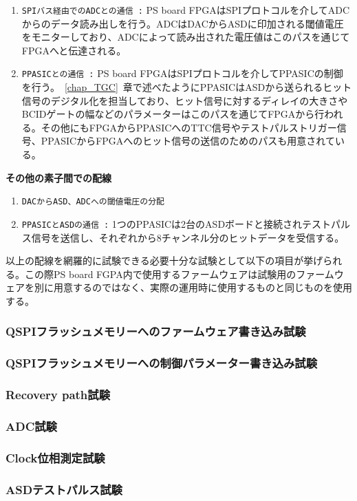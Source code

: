 \begin{enumerate}
    \item \texttt{SPIバス経由でのADCとの通信 :} PS board FPGAはSPIプロトコルを介してADCからのデータ読み出しを行う。ADCはDACからASDに印加される閾値電圧をモニターしており、ADCによって読み出された電圧値はこのパスを通じてFPGAへと伝達される。
    \baselineskip

    \item\texttt{PPASICとの通信 :} PS board FPGAはSPIプロトコルを介してPPASICの制御を行う。~\ref{chap_TGC}~章で述べたようにPPASICはASDから送られるヒット信号のデジタル化を担当しており、ヒット信号に対するディレイの大きさやBCIDゲートの幅などのパラメーターはこのパスを通じてFPGAから行われる。その他にもFPGAからPPASICへのTTC信号やテストパルストリガー信号、PPASICからFPGAへのヒット信号の送信のためのパスも用意されている。
    \baselineskip
\end{enumerate}

\textbf{その他の素子間での配線}
\begin{enumerate}[resume]
    \item \texttt{DACからASD、ADCへの閾値電圧の分配} 
    \baselineskip

    \item \texttt{PPASICとASDの通信 :} 1つのPPASICは2台のASDボードと接続されテストパルス信号を送信し、それぞれから8チャンネル分のヒットデータを受信する。
    \baselineskip
\end{enumerate}


以上の配線を網羅的に試験できる必要十分な試験として以下の項目が挙げられる。この際PS board FGPA内で使用するファームウェアは試験用のファームウェアを別に用意するのではなく、実際の運用時に使用するものと同じものを使用する。

\subsubsection{QSPIフラッシュメモリーへのファームウェア書き込み試験}
\label{subsubsec_QSPI}

\subsubsection{QSPIフラッシュメモリーへの制御パラメーター書き込み試験}
\label{subsubsec_QSPIparam}

\subsubsection{Recovery path試験}
\label{subsubsec_recovery}

\subsubsection{ADC試験}
\label{subsubsec_ADC}

\subsubsection{Clock位相測定試験}
\label{subsubsec_clock}

\subsubsection{ASDテストパルス試験}
\label{subsubsec_testpulse}







